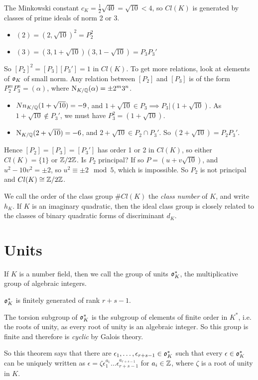 \documentclass[10pt,a4paper]{article}
\begin{document}
The Minkowski constant $c_K = \frac12 \sqrt{40} = \sqrt{10} < 4$, so $Cl(K)$ is generated by classes of prime ideals of norm 2 or 3.
\begin{itemize}
\item $(2) = (2, \sqrt{10})^2 = P_2^2$
\item $(3) = (3, 1+\sqrt{10})(3, 1-\sqrt{10}) = P_3P_3'$
\end{itemize}
So $[P_2]^2 = [P_3][P_3'] = 1$ in $Cl(K)$. To get more relations, look at elements of $\mathfrak{o}_K$ of small norm. Any relation between $[P_2]$ and $[P_3]$ is of the form $P_2^mP_3^n = (\alpha)$, where $\operatorname{N}_{K/\mathbb{Q}}(\alpha) = \pm 2^m 3^n$.
\begin{itemize}
\item $Nn_{K/\mathbb{Q}}(1+\sqrt{10}) = -9$, and $1+\sqrt{10} \in P_3 \implies P_3|(1+\sqrt{10})$. As $1+\sqrt{10} \notin P_3'$, we must have $P_3^2 = (1+\sqrt{10})$.
\item $\operatorname{N}_{K/\mathbb{Q}}(2+\sqrt{10}) = -6$, and $2+\sqrt{10} \in P_2 \cap P_3'$. So $(2+\sqrt{10}) = P_2P_3'$.
\end{itemize}
 Hence $[P_2] = [P_3] = [P_3']$ has order 1 or 2 in $Cl(K)$, so either $Cl(K) = \{1\}$ or $\mathbb{Z}/2\mathbb{Z}$. Is $P_2$ principal? If so $P = (u+v\sqrt{10})$, and $u^2-10v^2 = \pm 2$, so $u^2 \equiv \pm 2 \mod 5$, which is impossible. So $P_2$ is not principal and $Cl(K) \cong \mathbb{Z}/2\mathbb{Z}$.
 
We call the order of the class group $\#Cl(K)$ the \emph{class number} of $K$, and write $h_K$. If $K$ is an imaginary quadratic, then the ideal class group is closely related to the classes of binary quadratic forms of discriminant $d_K$.

\section{Units}
If $K$ is a number field, then we call the group of units $\mathfrak{o}_K^{\ast}$, the multiplicative group of algebraic integers.
\begin{theorem}
$\mathfrak{o}_K^{\ast}$ is finitely generated of rank $r+s-1$.
\end{theorem}
The torsion subgroup of $\mathfrak{o}_K^{\ast}$ is the subgroup of elements of finite order in $K^{\ast}$, i.e. the roots of unity, as every root of unity is an algebraic integer. So this group is finite and therefore is \textit{cyclic} by Galois theory.

So this theorem says that there are $\epsilon_1, \ldots, \epsilon_{r+s-1} \in \mathfrak{o}_K^{\ast}$ such that every $\epsilon \in \mathfrak{o}_K^{\ast}$ can be uniquely written as $\epsilon = \zeta \epsilon_1^{a_1} \ldots \epsilon_{r+s-1}^{a_{r+s-1}}$ for $a_i \in \mathbb{Z}$, where $\zeta$ is a root of unity in $K$.
\end{document}
